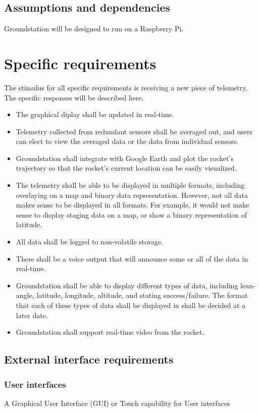 \documentclass[10pt,journal,draftclsnofoot,onecolumn]{IEEEtran}
\begin{document}
	\subsection{Assumptions and dependencies}
	Groundstation will be designed to run on a Raspberry Pi.
	
	\section{Specific requirements}
	
	The stimulus for all specific requirements is receiving a new piece of telemetry. The specific responses will be described here.
		
	\begin{itemize}
		\item The graphical diplay shall be updated in real-time.
		\item Telemetry collected from redundant sensors shall be averaged out, and users can elect to view the averaged data or the data from individual sensors.
		\item Groundstation shall integrate with Google Earth and plot the rocket's trajectory so that the rocket's current location can be easily visualized.
		\item The telemetry shall be able to be displayed in multiple formats, including overlaying on a map and binary data representation.
		However, not all data makes sense to be displayed in all formats.
		For example, it would not make sense to display staging data on a map, or show a binary representation of latitude.
		\item All data shall be logged to non-volatile storage.
		\item There shall be a voice output that will announce some or all of the data in real-time.
		\item Groundstation shall be able to display different types of data, including lean-angle, latitude, longitude, altitude, and stating success/failure. The format that each of these types of data shall be displayed in shall be decided at a later date.
		\item Groundstation shall support real-time video from the rocket.
	\end{itemize}
	
	\subsection{External interface requirements}
	\subsubsection{User interfaces}
	A Graphical User Interface (GUI) or Touch capability for User interfaces
\end{document}
